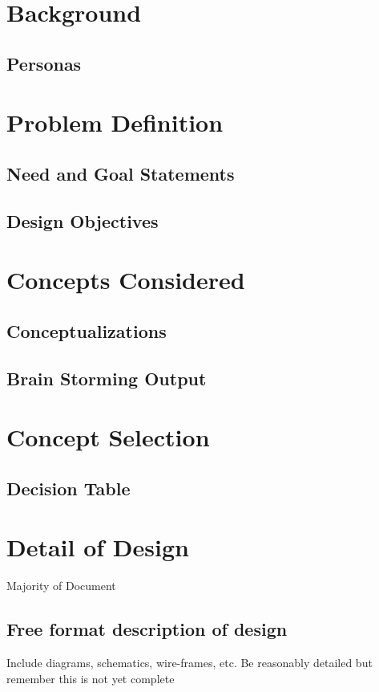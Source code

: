\documentclass{article}
\begin{document}
\section{Background}

\subsection{Personas}

\section{Problem Definition}

\subsection{Need and Goal Statements}

\subsection{Design Objectives}

\section{Concepts Considered}

\subsection{Conceptualizations}

\subsection{Brain Storming Output}

\section{Concept Selection}

\subsection{Decision Table}

\section{Detail of Design}
Majority of Document

\subsection{Free format description of design}
Include diagrams, schematics, wire-frames, etc.
Be reasonably detailed but remember this is not yet complete
\end{document}
